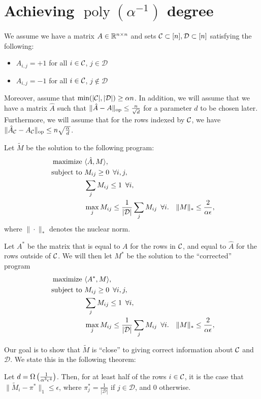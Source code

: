 \documentclass[11pt]{article}
\newcommand{\M}{\tilde{M}}
\newcommand{\A}{\hat{A}}
\newcommand{\Aa}{A^*}
\DeclareMathOperator{\poly}{poly}
\newcommand{\sD}{\mathcal{D}}
\begin{document}
\section{Achieving $\poly(\alpha^{-1})$ degree}
We assume we have a matrix $A \in \mathbb{R}^{n \times n}$ and sets 
$\sC \subset [n], \sD \subset [n]$ satisfying the following:
\begin{itemize}
\item $A_{i,j} = +1$ for all $i \in \mathcal{C}$, $j \in \sD$
\item $A_{i,j} = -1$ for all $i \in \mathcal{C}$, $j \not\in \sD$
\end{itemize}
Moreover, assume that $\min(|\sC|, |\sD|) \geq \alpha n$.
In addition, we will assume that we have a matrix $\A$ such 
that $\|\A-A\|_{\op} \leq \frac{n}{\sqrt{d}}$ for a parameter 
$d$ to be chosen later. Furthermore, we will assume that for the 
rows indexed by $\mathcal{C}$, we have $\|\A_{\sC}-A_{\sC}\|_{\op} \leq n\sqrt{\frac{\alpha}{d}}$.

Let $\M$ be the solution to the following program:
\begin{align}
\label{eq:optimization-noisy}
\text{maximize } &\langle \A, M \rangle, \\
\notag \text{ subject to } &M_{ij} \geq 0 \,\,\, \forall i,j, \\
\notag  &\sum_j M_{ij} \leq 1 \,\,\, \forall i, \\
\notag  &\max_j M_{ij} \leq \frac{1}{|\sD|}\sum_j M_{ij} \,\,\, \forall i.
\notag  &\|M\|_* \leq \frac{2}{\alpha\epsilon},
\end{align}
where $\|\cdot\|_*$ denotes the nuclear norm.

Let $\Aa$ be the matrix that is equal to $A$ for the rows in $\mathcal{C}$, 
and equal to $\A$ for the rows outside of $\mathcal{C}$. We will then let $M^*$ 
be the solution to the ``corrected'' program
\begin{align}
\label{eq:optimization-noiseless}
\text{maximize } &\langle \Aa, M \rangle, \\
\notag \text{ subject to } &M_{ij} \geq 0 \,\,\, \forall i,j, \\
\notag  &\sum_j M_{ij} \leq 1 \,\,\, \forall i, \\
\notag  &\max_j M_{ij} \leq \frac{1}{|\sD|}\sum_j M_{ij} \,\,\, \forall i.
\notag  &\|M\|_* \leq \frac{2}{\alpha\epsilon},
\end{align}

Our goal is to show that $\M$ is ``close'' to giving correct information about $\mathcal{C}$ and $\sD$. 
We state this in the following theorem:
\begin{theorem}
Let $d = \Omega\left(\frac{1}{\alpha^3\epsilon^4}\right)$. Then, for at least 
half of the rows $i \in \mathcal{C}$, it is the case that $\|\M_i - \pi^*\|_1 \leq \epsilon$, 
where $\pi^*_j = \frac{1}{|\sD|}$ if $j \in \sD$, and $0$ otherwise.
\end{theorem}
\end{document}
